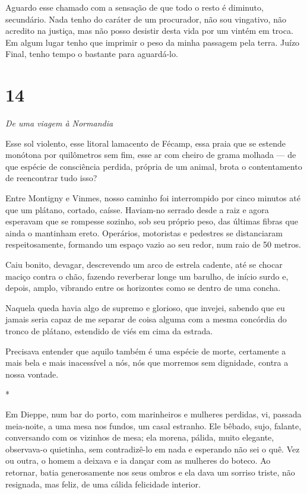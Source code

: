 Aguardo esse chamado com a sensação de que todo o resto é diminuto,
secundário. Nada tenho do caráter de um procurador, não sou vingativo,
não acredito na justiça, mas não posso desistir desta vida por um vintém
em troca. Em algum lugar tenho que imprimir o peso da minha passagem
pela terra. Juízo Final, tenho tempo o bastante para aguardá-lo.

\section{14}

\emph{De uma viagem à Normandia}

Esse sol violento, esse litoral lamacento de Fécamp, essa praia que se
estende monótona por quilômetros sem fim, esse ar com cheiro de grama
molhada --- de que espécie de consciência perdida, própria de um animal,
brota o contentamento de reencontrar tudo isso?

Entre Montigny e Vinmes, nosso caminho foi interrompido por cinco
minutos até que um plátano, cortado, caísse. Haviam-no serrado desde a
raiz e agora esperavam que se rompesse sozinho, sob seu próprio peso,
das últimas fibras que ainda o mantinham ereto. Operários, motoristas e
pedestres se distanciaram respeitosamente, formando um espaço vazio ao
seu redor, num raio de 50 metros.

Caiu bonito, devagar, descrevendo um arco de estrela cadente, até se
chocar maciço contra o chão, fazendo reverberar longe um barulho, de
início surdo e, depois, amplo, vibrando entre os horizontes como se
dentro de uma concha.

Naquela queda havia algo de supremo e glorioso, que invejei, sabendo que
eu jamais seria capaz de me separar de coisa alguma com a mesma
concórdia do tronco de plátano, estendido de viés em cima da estrada.

Precisava entender que aquilo também é uma espécie de morte, certamente
a mais bela e mais inacessível a nós, nós que morremos sem dignidade,
contra a nossa vontade.

*

Em Dieppe, num bar do porto, com marinheiros e mulheres perdidas, vi,
passada meia-noite, a uma mesa nos fundos, um casal estranho. Ele
bêbado, sujo, falante, conversando com os vizinhos de mesa; ela morena,
pálida, muito elegante, observava-o quietinha, sem contradizê-lo em nada
e esperando não sei o quê. Vez ou outra, o homem a deixava e ia dançar
com as mulheres do boteco. Ao retornar, batia generosamente nos seus
ombros e ela dava um sorriso triste, não resignada, mas feliz, de uma
cálida felicidade interior.

